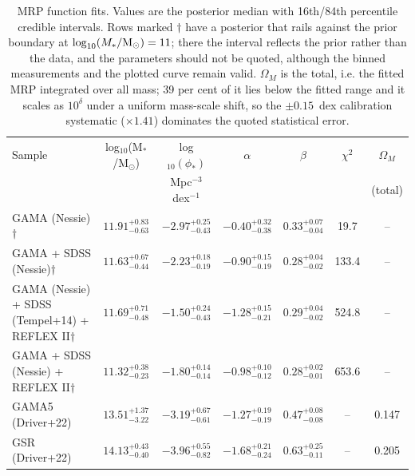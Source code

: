 \begin{table}
\centering
\caption{MRP function fits.  Values are the posterior median with 16th/84th percentile credible intervals.  Rows marked $\dagger$ have a posterior that rails against the prior boundary at $\log_{10}(M_*/{\rm M}_\odot) = 11$; there the interval reflects the prior rather than the data, and the parameters should not be quoted, although the binned measurements and the plotted curve remain valid.  $\Omega_M$ is the total, i.e. the fitted MRP integrated over all mass; 39 per cent of it lies below the fitted range and it scales as $10^{\delta}$ under a uniform mass-scale shift, so the $\pm0.15$~dex calibration systematic ($\times1.41$) dominates the quoted statistical error.}
\begin{tabular}{lcccccc}
\hline
Sample & log$_{10}$(M$_*$/M$_\odot$) & log$_{10}(\phi_*)$ & $\alpha$ & $\beta$ & $\chi^2$ & $\Omega_M$ \\
 & & Mpc$^{-3}$ dex$^{-1}$ & & & & (total) \\
\hline
GAMA (Nessie)$\dagger$ & $11.91^{+0.83}_{-0.63}$ & $-2.97^{+0.25}_{-0.43}$ & $-0.40^{+0.32}_{-0.38}$ & $0.33^{+0.07}_{-0.04}$ & 19.7 & -- \\
GAMA + SDSS (Nessie)$\dagger$ & $11.63^{+0.67}_{-0.44}$ & $-2.23^{+0.18}_{-0.19}$ & $-0.90^{+0.15}_{-0.19}$ & $0.28^{+0.04}_{-0.02}$ & 133.4 & -- \\
GAMA (Nessie) + SDSS (Tempel+14) + REFLEX II$\dagger$ & $11.69^{+0.71}_{-0.48}$ & $-1.50^{+0.24}_{-0.43}$ & $-1.28^{+0.15}_{-0.21}$ & $0.29^{+0.04}_{-0.02}$ & 524.8 & -- \\
GAMA + SDSS (Nessie) + REFLEX II$\dagger$ & $11.32^{+0.38}_{-0.23}$ & $-1.80^{+0.14}_{-0.14}$ & $-0.98^{+0.10}_{-0.12}$ & $0.28^{+0.02}_{-0.01}$ & 653.6 & -- \\
\hline
GAMA5 (Driver+22) & $13.51^{+1.37}_{-3.22}$ & $-3.19^{+0.67}_{-0.61}$ & $-1.27^{+0.19}_{-0.19}$ & $0.47^{+0.08}_{-0.08}$ & -- & 0.147 \\
GSR (Driver+22) & $14.13^{+0.43}_{-0.40}$ & $-3.96^{+0.55}_{-0.82}$ & $-1.68^{+0.21}_{-0.24}$ & $0.63^{+0.25}_{-0.11}$ & -- & 0.205 \\
\hline
\end{tabular}
\label{tab:mrp}
\end{table}
